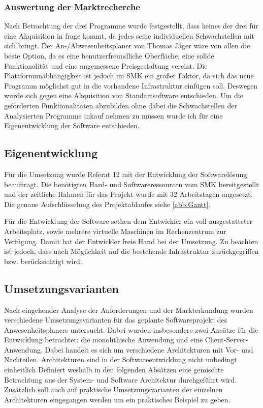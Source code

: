 \subsubsection{Auswertung der Marktrecherche}
\label{sec:AuswertungMarktrecherche}
Nach Betrachtung der drei Programme wurde festgestellt, dass keines der drei für eine Akquisition in frage kommt, da jedes seine individuellen Schwachstellen mit sich bringt. Der An-/Abwesenheitsplaner von Thomas Jäger wäre von allen die beste Option, da es eine benutzerfreundliche Oberfläche, eine solide Funktionalität und eine angemessene Preisgestaltung vereint. Die Plattformunabhängigkeit ist jedoch im SMK ein großer Faktor, da sich das neue Programm möglichst gut in die vorhandene Infrastruktur einfügen soll. Deswegen wurde sich gegen eine Akquisition von Standartsoftware entschieden. Um die geforderten Funktionalitäten abzubilden ohne dabei die Schwachstellen der Analysierten Programme inkauf nehmen zu müssen wurde ich für eine Eigenentwicklung der Software entschieden.

\subsection{Eigenentwicklung}
\label{sec:Eigenentwicklung}
Für die Umsetzung wurde Referat 12 mit der Entwicklung der Softwarelösung beauftragt. Die benötigten Hard- und Softwareressourcen vom SMK bereitgestellt und der zeitliche Rahmen für das Projekt wurde mit 32 Arbeitstagen angesetzt. Die genaue Aufschlüsselung des Projektablaufes siehe \ref{abb:Gantt}.

Für die Entwicklung der Software sethen dem Entwickler ein voll ausgestatteter Arbeitsplatz, sowie mehrere virtuelle Maschinen im Rechenzentrum zur Verfügung. Damit hat der Entwickler freie Hand bei der Umsetzung. Zu beachten ist jedoch, dass nach Möglichkeit auf die bestehende Infrastruktur zurückgegriffen bzw. berücksichtigt wird.


\subsection{Umsetzungsvarianten}
\label{sec:Umsetzungsvarianten}
Nach eingehender Analyse der Anforderungen und der Markterkundung wurden verschiedene Umsetzungsvarianten für das geplante Softwareprojekt des Anwesenheitsplaners untersucht. Dabei wurden insbesondere zwei Ansätze für die Entwicklung betrachtet: die monolithische Anwendung und eine Client-Server-Anwendung. Dabei handelt es sich um verschiedene Architekturen mit Vor- und Nachteilen. Architekturen sind in der Softwareentwicklung nicht unbedingt einheitlich Definiert weshalb in den folgenden Absätzen eine gemischte Betrachtung aus der System- und Software Architektur durchgeführt wird. Zusätzlich soll auch auf praktische Umsetzungsvarianten der einzelnen Architekturen eingegangen werden um ein praktisches Beispiel zu geben.

